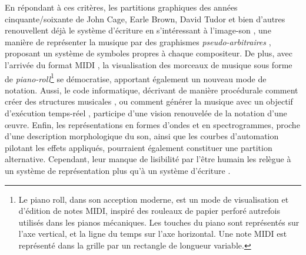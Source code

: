 En répondant à ces critères, les partitions graphiques des années cinquante/soixante de John Cage, Earle Brown, David Tudor et bien d'autres renouvellent déjà le système d'écriture en s'intéressant à l'\og image-son \fg, une manière de représenter la musique par des graphismes \textit{pseudo-arbitraires} \cite{saladin2004}, proposant un système de symboles propres à chaque compositeur.
De plus, avec l'arrivée du format MIDI \cite{midi1996}, la visualisation des morceaux de musique sous forme de \textit{piano-roll}\footnote{Le piano roll, dans son acception moderne, est un mode de visualisation et d’édition de notes MIDI, inspiré des rouleaux de papier perforé autrefois utilisés dans les pianos mécaniques. Les touches du piano sont représentés sur l’axe vertical, et la ligne du temps sur l’axe horizontal. Une note MIDI est représenté dans la grille par un rectangle de longueur variable.} se démocratise, apportant également un nouveau mode de notation. 
Aussi, le code informatique, décrivant de manière procédurale comment créer des structures musicales \cite{agon1998}, ou comment générer la musique avec un objectif d'exécution temps-réel \cite{puckette1991, mccartney1996, cont2008}, participe d'une vision renouvelée de la notation d'une œuvre.
Enfin, les représentations en formes d'ondes et en spectrogrammes, proche d'une description morphologique du son, ainsi que les courbes d'automation pilotant les effets appliqués, pourraient également constituer une partition alternative. Cependant, leur manque de lisibilité par l'être humain les relègue à un système de représentation plus qu'à un système d'écriture \cite{veitl2007}.

